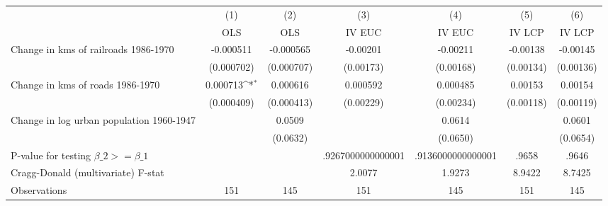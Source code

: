 {
\def\sym#1{\ifmmode^{#1}\else\(^{#1}\)\fi}
\begin{tabular}{l*{6}{c}}
\hline\hline
                &\multicolumn{1}{c}{(1)}&\multicolumn{1}{c}{(2)}&\multicolumn{1}{c}{(3)}&\multicolumn{1}{c}{(4)}&\multicolumn{1}{c}{(5)}&\multicolumn{1}{c}{(6)}\\
                &\multicolumn{1}{c}{OLS}&\multicolumn{1}{c}{OLS}&\multicolumn{1}{c}{IV EUC}&\multicolumn{1}{c}{IV EUC}&\multicolumn{1}{c}{IV LCP}&\multicolumn{1}{c}{IV LCP}\\
\hline
Change in kms of railroads 1986-1970&-0.000511         &-0.000565         & -0.00201         & -0.00211         & -0.00138         & -0.00145         \\
                &(0.000702)         &(0.000707)         &(0.00173)         &(0.00168)         &(0.00134)         &(0.00136)         \\
[1em]
Change in kms of roads 1986-1970& 0.000713\sym{*}  & 0.000616         & 0.000592         & 0.000485         &  0.00153         &  0.00154         \\
                &(0.000409)         &(0.000413)         &(0.00229)         &(0.00234)         &(0.00118)         &(0.00119)         \\
[1em]
Change in log urban population 1960-1947&                  &   0.0509         &                  &   0.0614         &                  &   0.0601         \\
                &                  & (0.0632)         &                  & (0.0650)         &                  & (0.0654)         \\
\hline
P-value for testing $\beta\_{2} >= \beta\_{1}$&                  &                  &.9267000000000001         &.9136000000000001         &    .9658         &    .9646         \\
Cragg-Donald (multivariate) F-stat&                  &                  &   2.0077         &   1.9273         &   8.9422         &   8.7425         \\
Observations    &      151         &      145         &      151         &      145         &      151         &      145         \\
\hline\hline
\end{tabular}
}
